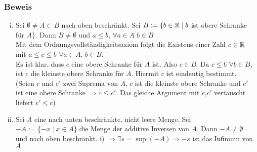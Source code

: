 \subsubsection*{Beweis}
\begin{enumerate}[i)]
\item Sei $\emptyset\not=A\subset B$ nach oben beschränkt. Sei $B:=\{b\in\mathbb{R}\mid b$ ist obere Schranke für $A\}$. Dann $B\not=\emptyset$ und $a\leq b$, $\forall a\in A$ $b\in B$\\

Mit dem Ordnungsvollständigkeitsaxiom folgt die Existens einer Zahl $c\in\mathbb{R}$ mit $a\leq c\leq b$ $\forall a\in A$, $b\in B$.\\

Es ist klar, dass $c$ eine obere Schranke für $A$ ist. Also $c\in B$. Da $c\leq b$ $\forall b\in B$, ist $c$ die kleinste obere Schranke für $A$. Hiermit $c$ ist eindeutig bestimmt.\\

(Seien $c$ und $c'$ zwei Suprema von $A$, $c$ ist die kleinste obere Schranke und $c'$ ist eine obere Schranke $\Rightarrow c\leq c'$. Das gleiche Argument mit $c$,$c'$ vertauscht liefert $c'\leq c$)
\item Sei $A$ eine nach unten beschränkte, nicht leere Menge. Sei $-A:=\{ -x\mid x\in A\}$ die Menge der additive Inversen von $A$. Dann $-A\not=\emptyset$ und nach oben beschränkt.  i) $\Rightarrow \exists s=\sup (-A)\Rightarrow -s$ ist das Infimum von $A$
\end{enumerate}

